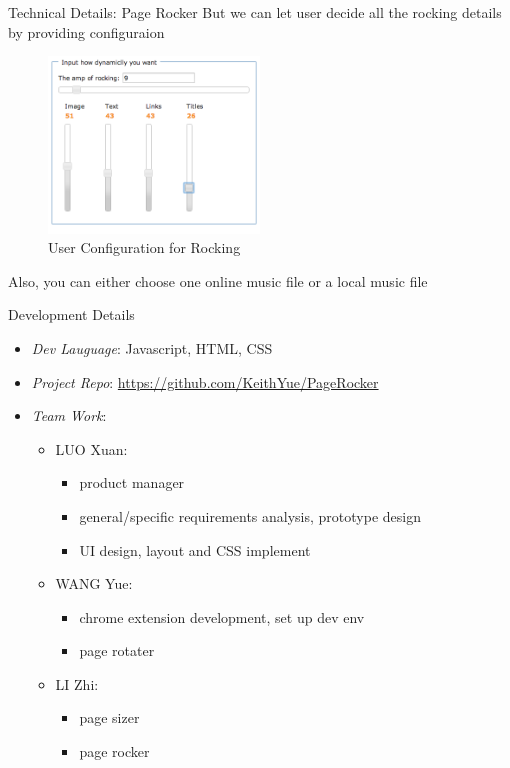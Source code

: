 \documentclass{beamer}
\begin{document}
\begin{frame}{Technical Details: Page Rocker}
But we can let user decide all the rocking details by providing configuraion
\begin{center}
    \begin{figure}
        \includegraphics[width=0.5\textwidth]{./images/amp_configuration.png}
        \caption{User Configuration for Rocking}
    \end{figure}
\end{center}
Also, you can either choose one online music file or a local music file
\end{frame}

\begin{frame}{Development Details}
\begin{itemize}
    \item \emph{Dev Lauguage}: Javascript, HTML, CSS
    \item \emph{Project Repo}: \url{https://github.com/KeithYue/PageRocker}
    \item \emph{Team Work}:
        \begin{itemize}
            \item LUO Xuan:
                \begin{itemize}
                    \item product manager
                    \item general/specific requirements analysis, prototype design
                    \item UI design, layout and CSS implement
                \end{itemize}
            \item WANG Yue:
                \begin{itemize}
                    \item chrome extension development, set up dev env
                    \item page rotater
                \end{itemize}
            \item LI Zhi:
                \begin{itemize}
                    \item page sizer
                    \item page rocker
                \end{itemize}
        \end{itemize}
\end{itemize}
\end{frame}
\end{document}
